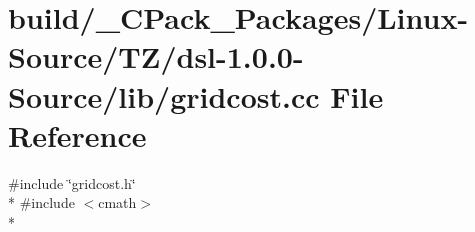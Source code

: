 \section{build/\-\_\-\-C\-Pack\-\_\-\-Packages/\-Linux-\/\-Source/\-T\-Z/dsl-\/1.0.0-\/\-Source/lib/gridcost.cc File Reference}
\label{build_2__CPack__Packages_2Linux-Source_2TZ_2dsl-1_80_80-Source_2lib_2gridcost_8cc}
{\ttfamily \#include \char`\"{}gridcost.\-h\char`\"{}}\\*
{\ttfamily \#include $<$cmath$>$}\\*

